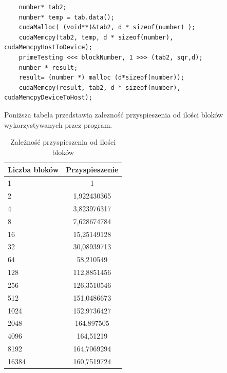 \documentclass[a4paper,12pt]{article}
\begin{document}
\begin{lstlisting}
    number* tab2;               
    number* temp = tab.data();         
    cudaMalloc( (void**)&tab2, d * sizeof(number) );                     
    cudaMemcpy(tab2, temp, d * sizeof(number), cudaMemcpyHostToDevice);  
    primeTesting <<< blockNumber, 1 >>> (tab2, sqr,d);                    
    number * result;                                                            
    result= (number *) malloc (d*sizeof(number));                               
    cudaMemcpy(result, tab2, d * sizeof(number), cudaMemcpyDeviceToHost);       
\end{lstlisting}

Poniższa tabela przedstawia zalezność przyspieszenia od ilości bloków wykorzystywanych przez program.
\begin{table}[!hbp]
\centering
\begin{tabular}{|p{5cm}|c|}
\hline 
Liczba bloków & Przyspieszenie \tabularnewline
\hline 
1	& 1\tabularnewline
2	& 1,922430365\tabularnewline
4	& 3,823976317\tabularnewline
8	& 7,628674784\tabularnewline
16 &	15,25149128\tabularnewline
32 &	30,08939713\tabularnewline
64 &	58,210549\tabularnewline
128 &	112,8851456\tabularnewline
256 &	126,3510546\tabularnewline
512 &	151,0486673\tabularnewline
1024 &	152,9736427\tabularnewline
2048 &	164,897505\tabularnewline
4096 &	164,51219\tabularnewline
8192 &	164,7069294\tabularnewline
16384	& 160,7519724\tabularnewline
\hline
\end{tabular}
\caption{Zależność przyspieszenia od ilości bloków}
\end{table}
\end{document}
